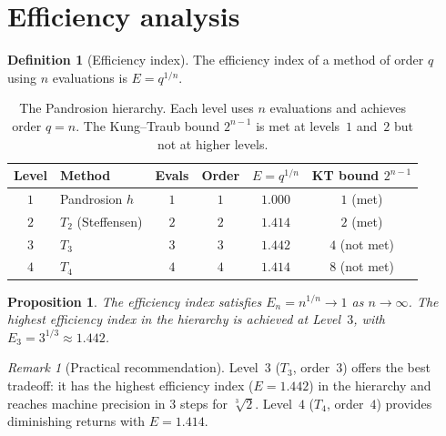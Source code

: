 \documentclass[10pt,a4paper,oneside]{book}
\newtheorem{proposition}[theorem]{Proposition}
\theoremstyle{definition}
\newtheorem{definition}[theorem]{Definition}
\theoremstyle{remark}
\newtheorem{remark}[theorem]{Remark}
\newcommand{\cbrt}[1]{\sqrt[3]{#1}}
\begin{document}
\section{Efficiency analysis}
\label{sec:efficiency}

\begin{definition}[Efficiency index]
The efficiency index of a method of order $q$ using $n$ evaluations is $E = q^{1/n}$.
\end{definition}

\begin{table}[H]
\centering
\renewcommand{\arraystretch}{1.2}
\begin{tabular}{clcccc}
\toprule
\textbf{Level} & \textbf{Method} & \textbf{Evals} & \textbf{Order} & \textbf{$E = q^{1/n}$} & \textbf{KT bound $2^{n-1}$} \\
\midrule
$1$ & Pandrosion $h$ & $1$ & $1$ & $1.000$ & $1$ (met) \\
$2$ & $T_2$ (Steffensen) & $2$ & $2$ & $1.414$ & $2$ (met) \\
$3$ & $T_3$ & $3$ & $3$ & $1.442$ & $4$ (not met) \\
$4$ & $T_4$ & $4$ & $4$ & $1.414$ & $8$ (not met) \\
\bottomrule
\end{tabular}
\caption{The Pandrosion hierarchy.  Each level uses $n$ evaluations and achieves order $q = n$.  The Kung--Traub bound $2^{n-1}$ is met at levels~$1$ and~$2$ but not at higher levels.}
\label{tab:hierarchy}
\end{table}

\begin{proposition}
The efficiency index satisfies $E_n = n^{1/n} \to 1$ as $n \to \infty$.  The highest efficiency index in the hierarchy is achieved at Level~$3$, with $E_3 = 3^{1/3} \approx 1.442$.
\end{proposition}

\begin{remark}[Practical recommendation]
Level~$3$ ($T_3$, order~$3$) offers the best tradeoff: it has the highest efficiency index ($E = 1.442$) in the hierarchy and reaches machine precision in $3$ steps for $\cbrt{2}$.  Level~$4$ ($T_4$, order~$4$) provides diminishing returns with $E = 1.414$.
\end{remark}

\end{document}
